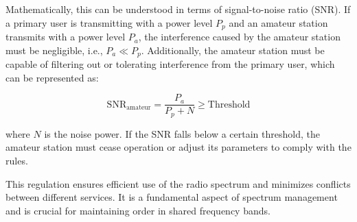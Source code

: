 Mathematically, this can be understood in terms of signal-to-noise ratio (SNR). If a primary user is transmitting with a power level \( P_p \) and an amateur station transmits with a power level \( P_a \), the interference caused by the amateur station must be negligible, i.e., \( P_a \ll P_p \). Additionally, the amateur station must be capable of filtering out or tolerating interference from the primary user, which can be represented as:

\[
\text{SNR}_{\text{amateur}} = \frac{P_a}{P_p + N} \geq \text{Threshold}
\]

where \( N \) is the noise power. If the SNR falls below a certain threshold, the amateur station must cease operation or adjust its parameters to comply with the rules.

This regulation ensures efficient use of the radio spectrum and minimizes conflicts between different services. It is a fundamental aspect of spectrum management and is crucial for maintaining order in shared frequency bands.

